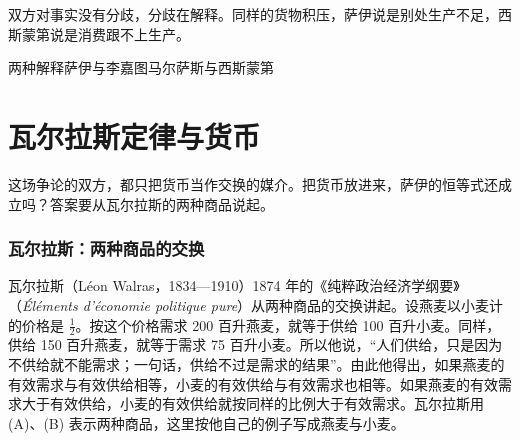双方对事实没有分歧，分歧在解释。同样的货物积压，萨伊说是别处生产不足，西斯蒙第说是消费跟不上生产。

\begin{compare}{两种解释}{萨伊与李嘉图}{马尔萨斯与西斯蒙第}
\end{compare}

\section{瓦尔拉斯定律与货币}\label{sec:say-walras}

这场争论的双方，都只把货币当作交换的媒介。把货币放进来，萨伊的恒等式还成立吗？答案要从瓦尔拉斯的两种商品说起。

\subsubsection{瓦尔拉斯：两种商品的交换}
瓦尔拉斯（Léon Walras，1834—1910）1874 年的《纯粹政治经济学纲要》（\emph{Éléments d'économie politique pure}）从两种商品的交换讲起\cite{walras1874}。设燕麦以小麦计的价格是 $\tfrac12$。按这个价格需求 200 百升燕麦，就等于供给 100 百升小麦。同样，供给 150 百升燕麦，就等于需求 75 百升小麦\cite{walras1874}。所以他说，“人们供给，只是因为不供给就不能需求；一句话，供给不过是需求的结果”\cite{walras1874}。由此他得出，如果燕麦的有效需求与有效供给相等，小麦的有效供给与有效需求也相等。如果燕麦的有效需求大于有效供给，小麦的有效供给就按同样的比例大于有效需求\cite{walras1874}。瓦尔拉斯用 (A)、(B) 表示两种商品，这里按他自己的例子写成燕麦与小麦。


